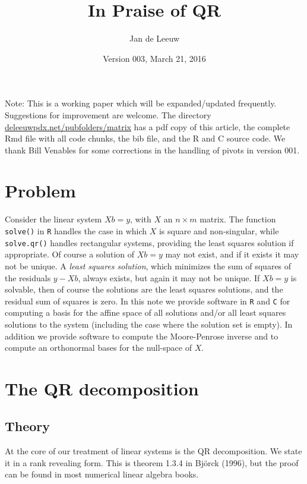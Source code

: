 \documentclass[12pt,]{article}
\title{In Praise of QR}
\author{Jan de Leeuw}
\date{Version 003, March 21, 2016}
\begin{document}
\maketitle

{
\setcounter{tocdepth}{3}
\tableofcontents
}
Note: This is a working paper which will be expanded/updated frequently.
Suggestions for improvement are welcome. The directory
\href{http://deleeuwpdx.net/pubfolders/matrix}{deleeuwpdx.net/pubfolders/matrix}
has a pdf copy of this article, the complete Rmd file with all code
chunks, the bib file, and the R and C source code. We thank Bill
Venables for some corrections in the handling of pivots in version 001.

\section{Problem}\label{problem}

Consider the linear system \(Xb=y\), with \(X\) an \(n\times m\) matrix.
The function \texttt{solve()} in \texttt{R} handles the case in which
\(X\) is square and non-singular, while \texttt{solve.qr()} handles
rectangular systems, providing the least squares solution if
appropriate. Of course a solution of \(Xb=y\) may not exist, and if it
exists it may not be unique. A \emph{least squares solution}, which
minimizes the sum of squares of the residuals \(y-Xb\), always exists,
but again it may not be unique. If \(Xb=y\) is solvable, then of course
the solutions are the least squares solutions, and the residual sum of
squares is zero. In this note we provide software in \texttt{R} and
\texttt{C} for computing a basis for the affine space of all solutions
and/or all least squares solutions to the system (including the case
where the solution set is empty). In addition we provide software to
compute the Moore-Penrose inverse and to compute an orthonormal bases
for the null-space of \(X\).

\section{The QR decomposition}\label{the-qr-decomposition}

\subsection{Theory}\label{theory}

At the core of our treatment of linear systems is the QR decomposition.
We state it in a rank revealing form. This is theorem 1.3.4 in Björck
(1996), but the proof can be found in most numerical linear algebra
books.
\end{document}

